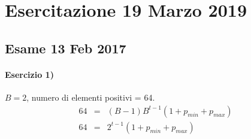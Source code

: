 \section{Esercitazione 19 Marzo 2019}

\subsection{Esame 13 Feb 2017}

\paragraph{Esercizio 1)} $B=2$, numero di elementi positivi = 64.
\[
\renewcommand{\arraystretch}{1.2}
\begin{array}{rcl}
    64 & = & (B-1)B^{t-1} (1 + p_{min} + p_{max})\\
    64 & = & 2^{t-1} (1 + p_{min} + p_{max})\\
    
\end{array}
\]